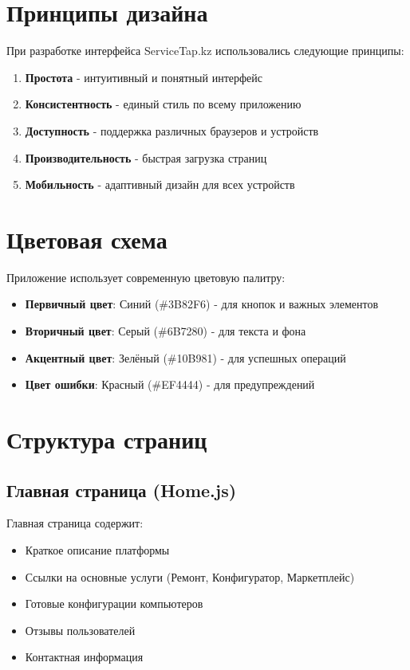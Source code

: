 \documentclass[12pt,a4paper]{report}
\begin{document}
\section{Принципы дизайна}
При разработке интерфейса ServiceTap.kz использовались следующие принципы:
\begin{enumerate}
    \item \textbf{Простота} - интуитивный и понятный интерфейс
    \item \textbf{Консистентность} - единый стиль по всему приложению
    \item \textbf{Доступность} - поддержка различных браузеров и устройств
    \item \textbf{Производительность} - быстрая загрузка страниц
    \item \textbf{Мобильность} - адаптивный дизайн для всех устройств
\end{enumerate}

\section{Цветовая схема}
Приложение использует современную цветовую палитру:
\begin{itemize}
    \item \textbf{Первичный цвет}: Синий (\#3B82F6) - для кнопок и важных элементов
    \item \textbf{Вторичный цвет}: Серый (\#6B7280) - для текста и фона
    \item \textbf{Акцентный цвет}: Зелёный (\#10B981) - для успешных операций
    \item \textbf{Цвет ошибки}: Красный (\#EF4444) - для предупреждений
\end{itemize}

\section{Структура страниц}

\subsection{Главная страница (Home.js)}
Главная страница содержит:
\begin{itemize}
    \item Краткое описание платформы
    \item Ссылки на основные услуги (Ремонт, Конфигуратор, Маркетплейс)
    \item Готовые конфигурации компьютеров
    \item Отзывы пользователей
    \item Контактная информация
\end{itemize}
\end{document}
